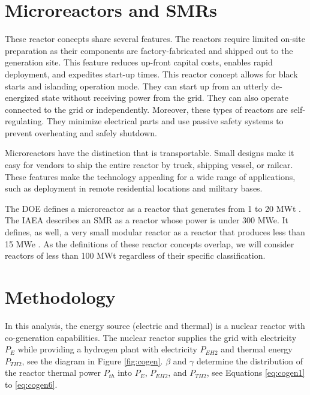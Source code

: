 \documentclass[11pt,letterpaper]{article}
\begin{document}
\section{Microreactors and \glspl{SMR}}
\label{sec:reactors}

These reactor concepts share several features.
The reactors require limited on-site preparation as their components are factory-fabricated and shipped out to the generation site.
This feature reduces up-front capital costs, enables rapid deployment, and expedites start-up times.
This reactor concept allows for black starts and islanding operation mode.
They can start up from an utterly de-energized state without receiving power from the grid.
They can also operate connected to the grid or independently.
Moreover, these types of reactors are self-regulating.
They minimize electrical parts and use passive safety systems to prevent overheating and safely shutdown.

Microreactors have the distinction that is transportable.
Small designs make it easy for vendors to ship the entire reactor by truck, shipping vessel, or railcar.
These features make the technology appealing for a wide range of applications, such as deployment in remote residential locations and military bases.

The \gls{DOE} defines a microreactor as a reactor that generates from 1 to 20 MWt \cite{us-doe_ultimate_2019}.
The \gls{IAEA} describes an \gls{SMR} as a reactor whose power is under 300 MWe.
It defines, as well, a very small modular reactor as a reactor that produces less than 15 MWe \cite{world_nuclear_association_small_2020}.
As the definitions of these reactor concepts overlap, we will consider reactors of less than 100 MWt regardless of their specific classification.

\section{Methodology}
\label{sec:metho}

In this analysis, the energy source (electric and thermal) is a nuclear reactor with co-generation capabilities.
The nuclear reactor supplies the grid with electricity $P_E$ while providing a hydrogen plant with electricity $P_{EH2}$ and thermal energy $P_{TH2}$, see the diagram in Figure \ref{fig:cogen}.
$\beta$ and $\gamma$ determine the distribution of the reactor thermal power $P_{th}$ into $P_E$, $P_{EH2}$, and $P_{TH2}$, see Equations \ref{eq:cogen1} to \ref{eq:cogen6}.
\end{document}
